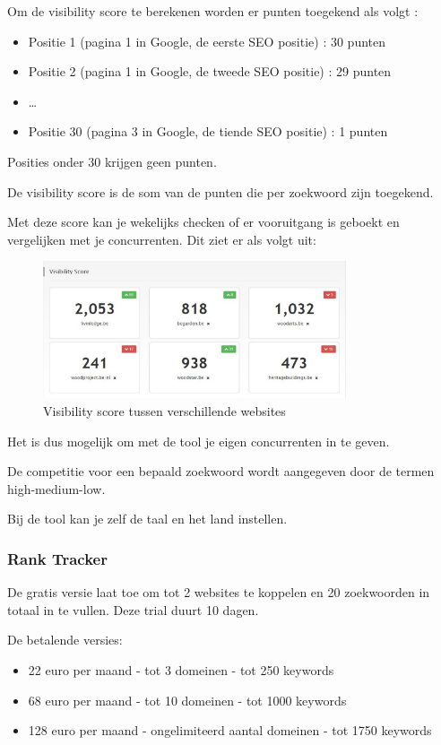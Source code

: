 Om de visibility score te berekenen worden er punten toegekend als volgt :
\begin{itemize}
\item Positie 1 (pagina 1 in Google, de eerste SEO positie) : 30 punten
\item Positie 2 (pagina 1 in Google, de tweede SEO positie) : 29 punten
\item …
\item Positie 30 (pagina 3 in Google, de tiende SEO positie) : 1 punten
\end{itemize}
Posities onder 30 krijgen geen punten.

De visibility score is de som van de punten die per zoekwoord zijn toegekend.

Met deze score kan je wekelijks checken of er vooruitgang is geboekt en vergelijken met je concurrenten. Dit ziet er als volgt uit: 

\begin{figure}[h!]
\centering
\includegraphics[width=0.8\textwidth]{img/awrcloudvisibility.PNG}
\caption{Visibility score tussen verschillende websites
\autocite{awrcloud}}
\end{figure}

Het is dus mogelijk om met de tool je eigen concurrenten in te geven.

De competitie voor een bepaald zoekwoord wordt aangegeven door de termen high-medium-low. 

Bij de tool kan je zelf de taal en het land instellen. 

\subsubsection{Rank Tracker}
\label{ch: Rank Tracker}

De gratis versie laat toe om tot 2 websites te koppelen en 20 zoekwoorden in totaal in te vullen. Deze trial duurt 10 dagen. 

De betalende versies: 
\begin{itemize}
\item 22 euro per maand - tot 3 domeinen - tot 250 keywords
\item 68 euro per maand - tot 10 domeinen - tot 1000 keywords
\item 128 euro per maand - ongelimiteerd aantal domeinen - tot 1750 keywords
\end{itemize}

